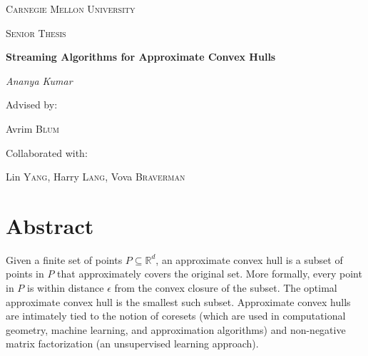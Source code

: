 \documentclass[12pt]{report}
\theoremstyle{definition}
\theoremstyle{lemma}
\theoremstyle{theorem}
\theoremstyle{corollary}
\begin{document}
\begin{titlepage}
  \centering
  {\scshape\LARGE Carnegie Mellon University \par}
  \vspace{1cm}
  {\scshape\Large Senior Thesis\par}
  \vspace{1.5cm}
  {\huge\bfseries Streaming Algorithms for Approximate Convex Hulls\par}
  \vspace{2cm}
  {\Large\itshape Ananya Kumar\par}
  \vfill
  Advised by:\par
  Avrim \textsc{Blum}
  \vspace{3mm}

  Collaborated with:\par
  Lin \textsc{Yang}, Harry \textsc{Lang}, Vova \textsc{Braverman}

  \vfill
\end{titlepage}




\chapter*{Abstract}

Given a finite set of points $P \subseteq \mathbb{R}^d$, an approximate convex hull is a subset of points in $P$ that approximately covers the original set. More formally, every point in $P$ is within distance $\epsilon$ from the convex closure of the subset. The optimal approximate convex hull is the smallest such subset. Approximate convex hulls are intimately tied to the notion of coresets (which are used in computational geometry, machine learning, and approximation algorithms) and non-negative matrix factorization (an unsupervised learning approach).
\\
\end{document}
